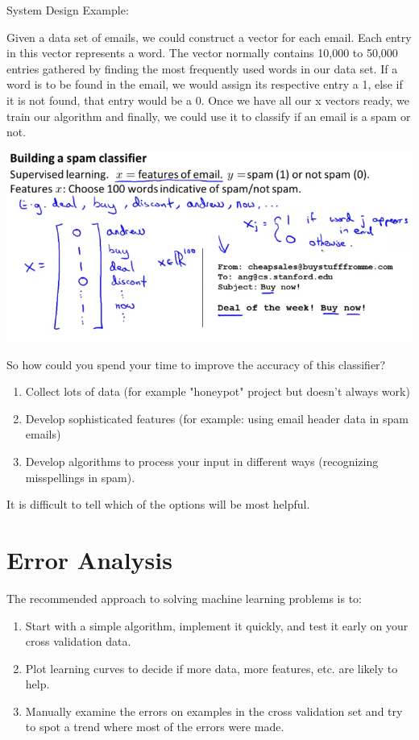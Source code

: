 \documentclass[10pt,a4paper,UTF8]{article}
\begin{document}
System Design Example:

Given a data set of emails, we could construct a vector for each email. Each entry in this vector represents a word. The vector normally contains 10,000 to 50,000 entries gathered by finding the most frequently used words in our data set. If a word is to be found in the email, we would assign its respective entry a 1, else if it is not found, that entry would be a 0. Once we have all our x vectors ready, we train our algorithm and finally, we could use it to classify if an email is a spam or not.

\begin{center}
\includegraphics[width=.9\linewidth]{../../img/computer_ng/20171015spam.png}
\end{center}

So how could you spend your time to improve the accuracy of this classifier?

\begin{enumerate}
\item Collect lots of data (for example "honeypot" project but doesn't always work)
\item Develop sophisticated features (for example: using email header data in spam emails)
\item Develop algorithms to process your input in different ways (recognizing misspellings in spam).
\end{enumerate}

It is difficult to tell which of the options will be most helpful.
\section{Error Analysis}
\label{sec:orgdab3a09}


The recommended approach to solving machine learning problems is to:

\begin{enumerate}
\item Start with a simple algorithm, implement it quickly, and test it early on your cross validation data.
\item Plot learning curves to decide if more data, more features, etc. are likely to help.
\item Manually examine the errors on examples in the cross validation set and try to spot a trend where most of the errors were made.
\end{enumerate}
\end{document}
